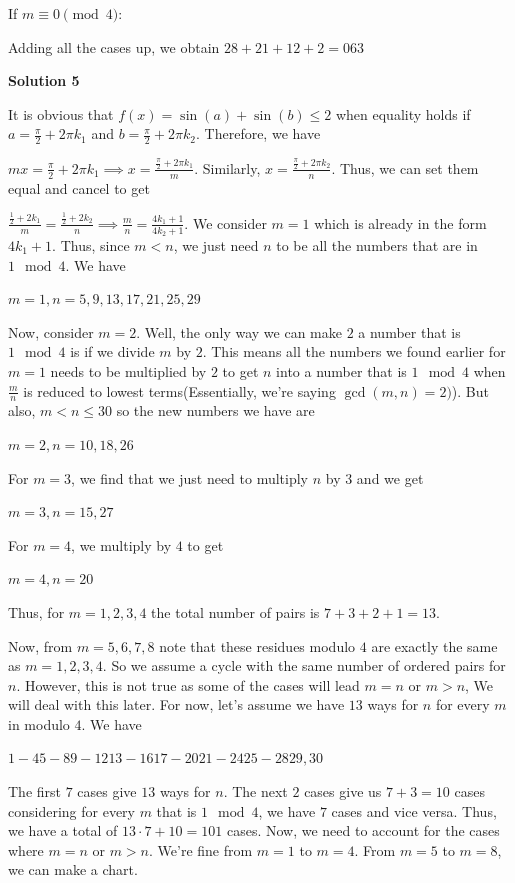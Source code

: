 \begin{enumerate}
 If $m\equiv 0\pmod{4}$:

 Adding all the cases up, we obtain $28+21+12+2=\boxed{063}$




\textbf{Solution 5}

It is obvious that $f(x) = \sin(a) + \sin(b) \leq 2$ when equality holds if $a = \frac{\pi}{2} + 2\pi k_1$ and $b = \frac{\pi}{2} + 2\pi k_2$. Therefore, we have

 $mx = \frac{\pi}{2} + 2\pi k_1 \implies x = \frac{\frac{\pi}{2} + 2\pi k_1}{m}$. Similarly, $x = \frac{\frac{\pi}{2} + 2\pi k_2}{n}$. Thus, we can set them equal and cancel to get

 $\frac{\frac{1}{2} + 2k_1}{m} = \frac{\frac{1}{2} + 2k_2}{n} \implies \frac{m}{n} = \frac{4k_1 + 1}{4k_2 + 1}$. We consider $m = 1$ which is already in the form $4k_1 + 1$. Thus, since $m < n$, we just need $n$ to be all the numbers that are in $1 \mod 4$. We have

 $m = 1, n = 5, 9, 13, 17, 21, 25, 29$

 Now, consider $m = 2$. Well, the only way we can make $2$ a number that is $1 \mod 4$ is if we divide $m$ by $2$. This means all the numbers we found earlier for $m = 1$ needs to be multiplied by $2$ to get $n$ into a number that is $1 \mod 4$ when $\frac{m}{n}$ is reduced to lowest terms(Essentially, we're saying $\gcd(m, n) = 2)$). But also, $m < n \leq 30$ so the new numbers we have are

 $m = 2, n = 10, 18, 26$

 For $m = 3$, we find that we just need to multiply $n$ by $3$ and we get

 $m = 3, n = 15, 27$

 For $m = 4$, we multiply by $4$ to get

 $m = 4, n = 20$

 Thus, for $m = 1, 2, 3, 4$ the total number of pairs is $7 + 3 + 2 + 1 = 13$.

 Now, from $m = 5, 6, 7, 8$ note that these residues modulo $4$ are exactly the same as $m = 1, 2, 3, 4$. So we assume a cycle with the same number of ordered pairs for $n$. However, this is not true as some of the cases will lead $m = n$ or $m > n$, We will deal with this later. For now, let's assume we have $13$ ways for $n$ for every $m$ in modulo $4$. We have

 $1 - 4$$5 - 8$$9 - 12$$13 - 16$$17 - 20$$21 - 24$$25 - 28$$29, 30$

 The first $7$ cases give $13$ ways for $n$. The next $2$ cases give us $7 + 3 = 10$ cases considering for every $m$ that is $1 \mod 4$, we have $7$ cases and vice versa. Thus, we have a total of $13 \cdot 7 + 10 = 101$ cases. Now, we need to account for the cases where $m = n$ or $m > n$. We're fine from $m = 1$ to $m = 4$. From $m = 5$ to $m = 8$, we can make a chart.


\end{enumerate}
